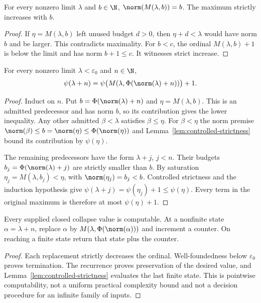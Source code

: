 \begin{lemma}\label{lem:saturation}
For every nonzero limit $\lambda$ and $b\in\N$,
$\norm(M(\lambda,b))=b$.  The maximum strictly increases with $b$.
\end{lemma}
\begin{proof}
If $\eta=M(\lambda,b)$ left unused budget $d>0$, then $\eta+d<\lambda$
would have norm $b$ and be larger.  This contradicts maximality.  For $b<c$,
the ordinal $M(\lambda,b)+1$ is below the limit and has norm $b+1\le c$.
It witnesses strict increase.
\end{proof}

\begin{theorem}\label{thm:single-predecessor}
For every nonzero limit $\lambda<\varepsilon_0$ and $n\in\N$,
\[
 \psi(\lambda+n)=
 \psi\bigl(M(\lambda,\Phi(\norm(\lambda)+n))\bigr)+1.
\]
\end{theorem}
\begin{proof}
Induct on $n$.  Put $b=\Phi(\norm(\lambda)+n)$ and
$\eta=M(\lambda,b)$.  This is an admitted predecessor and has norm $b$,
so its contribution gives the lower inequality.  Any other admitted
$\beta<\lambda$ satisfies $\beta\le\eta$.  For $\beta<\eta$ the norm
premise $\norm(\beta)\le b=\norm(\eta)\le\Phi(\norm(\eta))$ and
Lemma~\ref{lem:controlled-strictness} bound its contribution by $\psi(\eta)$.

The remaining predecessors have the form $\lambda+j$, $j<n$.  Their budgets
$b_j=\Phi(\norm(\lambda)+j)$ are strictly smaller than $b$.  By saturation
$\eta_j=M(\lambda,b_j)<\eta$, with $\norm(\eta_j)=b_j<b$.
Controlled strictness and the induction hypothesis give
$\psi(\lambda+j)=\psi(\eta_j)+1\le\psi(\eta)$.  Every term in the
original maximum is therefore at most $\psi(\eta)+1$.
\end{proof}

\begin{corollary}\label{cor:closed-evaluation}
Every supplied closed collapse value is computable.  At a nonfinite state
$\alpha=\lambda+n$, replace $\alpha$ by
$M(\lambda,\Phi(\norm(\alpha)))$ and increment a counter.  On reaching
a finite state return that state plus the counter.
\end{corollary}
\begin{proof}
Each replacement strictly decreases the ordinal.  Well-foundedness below
$\varepsilon_0$ proves termination.  The recurrence proves preservation
of the desired value, and Lemma~\ref{lem:controlled-strictness} evaluates the
last finite state.  This is pointwise computability, not a uniform practical
complexity bound and not a decision procedure for an infinite family of inputs.
\end{proof}

